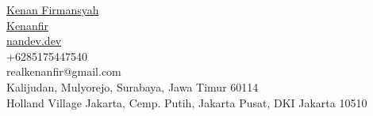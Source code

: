 \documentclass[11pt,a4paper]{article}
\begin{document}
\begin{minipage}[t]{6cm}
\begin{minipage}[t]{5.5cm}
 \href{https://linkedin.com/in/kenanfirmansyah}{Kenan Firmansyah}\\[6pt]
 \href{https://github.com/Kenanfir}{Kenanfir}\\[6pt]
 \href{https://nandev.dev}{nandev.dev}\\[6pt]
 +6285175447540\\[6pt]
 realkenanfir@gmail.com\\[10pt]

{\small\color{lighttext}Kalijudan, Mulyorejo, Surabaya, Jawa Timur 60114}\\[6pt]

{\small\color{lighttext}Holland Village Jakarta, Cemp. Putih, Jakarta Pusat, DKI Jakarta 10510}

\end{minipage}
\end{minipage}%
%
\end{document}
